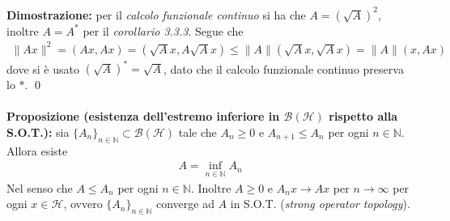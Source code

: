 \documentclass{article}
\numberwithin{equation}{subsection}
\begin{document}
\textbf{Dimostrazione:} per il \textit{calcolo funzionale continuo} si ha che $A = (\sqrt{A})^2$, inoltre $A = A^*$ per il \textit{corollario 3.3.3}. Segue che 
\begin{align*}
    \|Ax\|^2 = (Ax, Ax) = (\sqrt{A}x, A\sqrt{A}x) \leq \|A\|(\sqrt{A}x, \sqrt{A}x) = \|A\|(x, Ax) 
\end{align*}
dove si è usato $(\sqrt{A})^* = \sqrt{A}$, dato che il calcolo funzionale continuo preserva lo $*$.  \qed \\ \\
\textbf{Proposizione (esistenza dell'estremo inferiore in $\mathcal{B}(\mathcal{H})$ rispetto alla S.O.T.):} sia $\{A_n\}_{n \in \mathbb{N}} \subset \mathcal{B}(\mathcal{H})$ tale che $A_n \geq 0$ e $A_{n + 1} \leq A_n$ per ogni $n \in \mathbb{N}$. Allora esiste 
\begin{align*}
    A = \inf_{n \in \mathbb{N}} A_n 
\end{align*}
Nel senso che $A \leq A_n$ per ogni $n \in \mathbb{N}$. Inoltre $A \geq 0$ e $A_nx \rightarrow Ax$ per $n \rightarrow \infty$ per ogni $x \in \mathcal{H}$, ovvero $\{A_n\}_{n \in \mathbb{N}}$ converge ad $A$ in S.O.T. (\textit{strong operator topology}). \\
\end{document}
